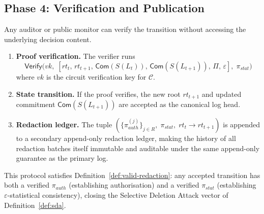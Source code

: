 \subsection{Phase 4: Verification and Publication}
\label{subsec:verify}

Any auditor or public monitor can verify the transition without accessing
the underlying decision content.

\begin{enumerate}
  \item \textbf{Proof verification.} The verifier runs
  \[
    \mathsf{Verify}\bigl(
      \mathit{vk},\;
      [\mathit{rt}_t,\, \mathit{rt}_{t+1},\,
       \mathsf{Com}(S(L_t)),\, \mathsf{Com}(S(L_{t+1})),\,
       \Pi,\, \varepsilon],\;
      \pi_{\mathit{stat}}
    \bigr)
  \]
  where $\mathit{vk}$ is the circuit verification key for $\mathcal{C}$.
  \item \textbf{State transition.} If the proof verifies, the new root
  $\mathit{rt}_{t+1}$ and updated commitment $\mathsf{Com}(S(L_{t+1}))$
  are accepted as the canonical log head.
  \item \textbf{Redaction ledger.} The tuple
  $(\{\pi_{\mathit{auth}}^{(j)}\}_{j \in R},\; \pi_{\mathit{stat}},\;
  \mathit{rt}_t \to \mathit{rt}_{t+1})$ is appended to a secondary
  append-only redaction ledger, making the history of all redaction
  batches itself immutable and auditable under the same append-only
  guarantee as the primary log.
\end{enumerate}

\noindent This protocol satisfies Definition~\ref{def:valid-redaction}:
any accepted transition has both a verified $\pi_{\mathit{auth}}$
(establishing authorisation) and a verified $\pi_{\mathit{stat}}$
(establishing $\varepsilon$-statistical consistency), closing the
Selective Deletion Attack vector of Definition~\ref{def:sda}.
